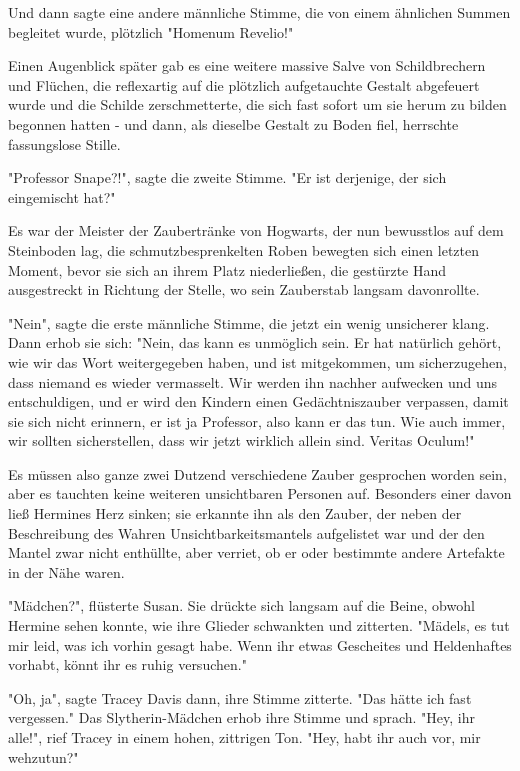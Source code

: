{Und dann sagte eine andere männliche Stimme, die von einem ähnlichen Summen begleitet wurde, plötzlich "Homenum Revelio!"

Einen Augenblick später gab es eine weitere massive Salve von Schildbrechern und Flüchen, die reflexartig auf die plötzlich aufgetauchte Gestalt abgefeuert wurde und die Schilde zerschmetterte, die sich fast sofort um sie herum zu bilden begonnen hatten - und dann, als dieselbe Gestalt zu Boden fiel, herrschte fassungslose Stille.

"Professor Snape?!", sagte die zweite Stimme. "Er ist derjenige, der sich eingemischt hat?"

Es war der Meister der Zaubertränke von Hogwarts, der nun bewusstlos auf dem Steinboden lag, die schmutzbesprenkelten Roben bewegten sich einen letzten Moment, bevor sie sich an ihrem Platz niederließen, die gestürzte Hand ausgestreckt in Richtung der Stelle, wo sein Zauberstab langsam davonrollte.

"Nein", sagte die erste männliche Stimme, die jetzt ein wenig unsicherer klang. Dann erhob sie sich: "Nein, das kann es unmöglich sein. Er hat natürlich gehört, wie wir das Wort weitergegeben haben, und ist mitgekommen, um sicherzugehen, dass niemand es wieder vermasselt. Wir werden ihn nachher aufwecken und uns entschuldigen, und er wird den Kindern einen Gedächtniszauber verpassen, damit sie sich nicht erinnern, er ist ja Professor, also kann er das tun. Wie auch immer, wir sollten sicherstellen, dass wir jetzt wirklich allein sind. Veritas Oculum!"

Es müssen also ganze zwei Dutzend verschiedene Zauber gesprochen worden sein, aber es tauchten keine weiteren unsichtbaren Personen auf. Besonders einer davon ließ Hermines Herz sinken; sie erkannte ihn als den Zauber, der neben der Beschreibung des Wahren Unsichtbarkeitsmantels aufgelistet war und der den Mantel zwar nicht enthüllte, aber verriet, ob er oder bestimmte andere Artefakte in der Nähe waren.

"Mädchen?", flüsterte Susan. Sie drückte sich langsam auf die Beine, obwohl Hermine sehen konnte, wie ihre Glieder schwankten und zitterten. "Mädels, es tut mir leid, was ich vorhin gesagt habe. Wenn ihr etwas Gescheites und Heldenhaftes vorhabt, könnt ihr es ruhig versuchen."

"Oh, ja", sagte Tracey Davis dann, ihre Stimme zitterte. "Das hätte ich fast vergessen." Das Slytherin-Mädchen erhob ihre Stimme und sprach. "Hey, ihr alle!", rief Tracey in einem hohen, zittrigen Ton. "Hey, habt ihr auch vor, mir wehzutun?"

}
